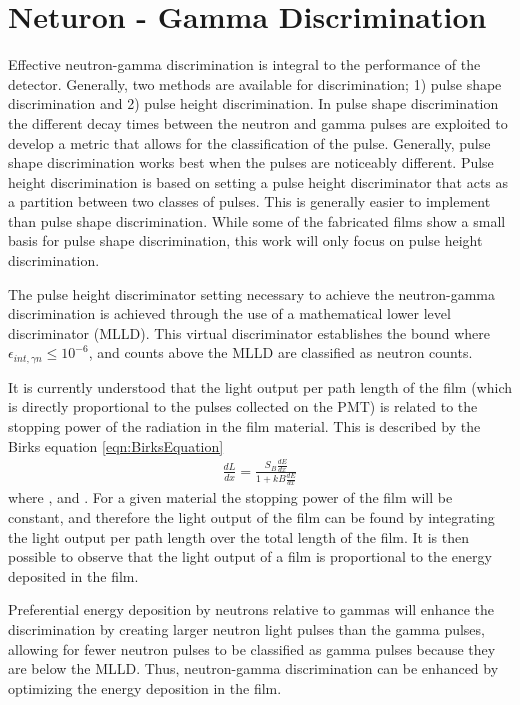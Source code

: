 \chapter{Neturon - Gamma Discrimination}
\label{ch:SecElectron}

Effective neutron-gamma discrimination is integral to the performance of the detector.
Generally, two methods are available for discrimination; 1) pulse shape discrimination and 2) pulse height discrimination.
In pulse shape discrimination the different decay times between the neutron and gamma pulses are exploited to develop a metric that allows for the classification of the pulse.
Generally, pulse shape discrimination works best when the pulses are noticeably different.
Pulse height discrimination is based on setting a pulse height discriminator that acts as a partition between two classes of pulses.
This is generally easier to implement than pulse shape discrimination.
While some of the fabricated films show a small basis for pulse shape discrimination, this work will only focus on pulse height discrimination.

The pulse height discriminator setting necessary to achieve the neutron-gamma discrimination is achieved through the use of a mathematical lower level discriminator (MLLD).
This virtual discriminator establishes the bound where $\epsilon_{int,\gamma n}\leq 10^{-6}$, and counts above the MLLD are classified as neutron counts. 

It is currently understood that the light output per path length of the film (which is directly proportional to the pulses collected on the PMT) is related to the stopping power of the radiation in the film material.
This is described by the Birks equation \eqref{eqn:BirksEquation}
\begin{align}
  \label{eqn:BirksEquation}
  \frac{dL}{dx} = \frac{S_B\frac{dE}{dx}}{1+kB\frac{dE}{dx}}
\end{align}
where , and .
For a given material the stopping power of the film will be constant, and therefore the light output of the film can be found by integrating the light output per path length over the total length of the film.
It is then possible to observe that the light output of a film is proportional to the energy deposited in the film.

Preferential energy deposition by neutrons relative to gammas will enhance the discrimination by creating larger neutron light pulses than the gamma pulses, allowing for fewer neutron pulses to be classified as gamma pulses because they are below the MLLD.
Thus, neutron-gamma discrimination can be enhanced by optimizing the energy deposition in the film.
